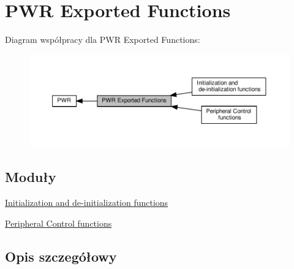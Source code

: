 \hypertarget{group___p_w_r___exported___functions}{}\section{P\+WR Exported Functions}
\label{group___p_w_r___exported___functions}
Diagram współpracy dla P\+WR Exported Functions\+:\nopagebreak
\begin{figure}[H]
\begin{center}
\leavevmode
\includegraphics[width=350pt]{group___p_w_r___exported___functions}
\end{center}
\end{figure}
\subsection*{Moduły}
\begin{DoxyCompactItemize}
\item 
\hyperlink{group___p_w_r___exported___functions___group1}{Initialization and de-\/initialization functions}
\item 
\hyperlink{group___p_w_r___exported___functions___group2}{Peripheral Control functions}
\end{DoxyCompactItemize}


\subsection{Opis szczegółowy}
